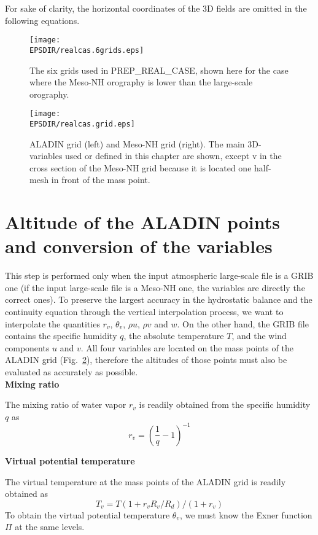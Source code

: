 For sake of clarity, the horizontal coordinates of the 3D fields are omitted
in the following equations.

\begin{figure}[!ht]
\centerline{\texttt{[image: \\EPSDIR/realcas.6grids.eps]}}
\caption{The six grids used in PREP\_REAL\_CASE, shown here for the case
where the Meso-NH orography is lower than the large-scale orography.
\label{fivegrids}}
\end{figure}

\clearpage

\begin{figure}[!ht]
\centerline{\texttt{[image: \\EPSDIR/realcas.grid.eps]}}
\caption{ALADIN grid (left) and Meso-NH grid (right).
The main 3D-variables used or defined in this chapter
are shown, except v in the cross section of the Meso-NH grid because it
is located one half-mesh in front of the mass point.
\label{grids}}
\end{figure}
\section{Altitude of the ALADIN points and conversion of the variables}

This step is performed only when the input atmospheric large-scale file
is a GRIB one (if the input large-scale file is a Meso-NH one,
the variables are directly the correct ones). To preserve the largest
accuracy in the hydrostatic balance and the continuity equation through the
vertical interpolation process, we want to interpolate the quantities
$r_v$, $\theta_v$, $\rho u$, $\rho v$ and $w$. On the other hand, the GRIB
file contains the specific humidity $q$, the absolute temperature $T$,
and the wind components $u$ and $v$. All four variables are located on
the mass points of the ALADIN grid (Fig.~\ref{grids}),
therefore the altitudes of
those points must also be evaluated as accurately as possible. \\

{\bf Mixing ratio}

The mixing ratio of water vapor $r_v$ is readily obtained from the specific
humidity $q$ as
\begin{equation}
r_v=\left(\frac{1}{q}-1\right)^{-1}
\end{equation}

{\bf Virtual potential temperature}

The virtual temperature at the mass points of the ALADIN grid is readily obtained
as
\begin{equation}
T_v= T  (1+r_v R_v/R_d)/(1+r_v)
\end{equation}
To obtain the virtual potential temperature $\theta_v$, we must know the
Exner function $\Pi$ at the same levels.

